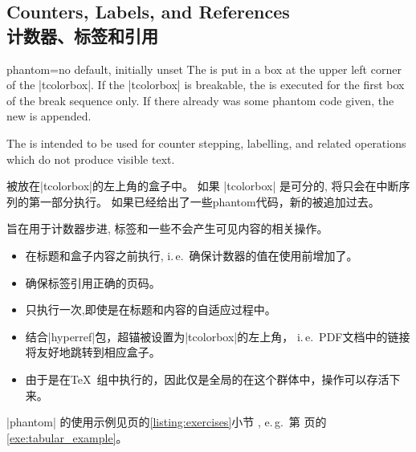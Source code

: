 \setcounter{section}{4}
\setcounter{subsection}{20}
\setcounter{subsubsection}{0}

\subsection{Counters, Labels, and References\\计数器、标签和引用}%
 
\begin{docTcbKey}{phantom}{=}{no default, initially unset}
The  is put in a box at the upper left corner of the |tcolorbox|.
If the |tcolorbox| is breakable, the  is executed for the first box of
the break sequence only. If there already was some phantom code given, the
new  is appended.\par
The  is intended to be used for counter stepping, labelling, and
related operations which do not produce visible text.

被放在|tcolorbox|的左上角的盒子中。%
如果 |tcolorbox| 是可分的,  将只会在中断序列的第一部分执行。%
如果已经给出了一些phantom代码，新的被追加过去。\par
{}旨在用于计数器步进, 标签和一些不会产生可见内容的相关操作。
\begin{itemize}
\item 
在标题和盒子内容之前执行, i.\,e.\ 确保计数器的值在使用前增加了。
\item %
确保标签引用正确的页码。
\item 
只执行一次,即使是在标题和内容的自适应过程中。
\item 
结合|hyperref|包，超锚被设置为|tcolorbox|的左上角， i.\,e.\ PDF文档中的链接将友好地跳转到相应盒子。

\item 
由于是在\TeX\ 组中执行的，因此仅是全局的在这个群体中，操作可以存活下来。
\end{itemize}
|phantom| 的使用示例见\pageref{listing:exercises}页的\ref{listing:exercises}小节
, e.\,g.\ 第 \pageref{exe:tabular_example} 页的 \ref{exe:tabular_example}。
\end{docTcbKey}


